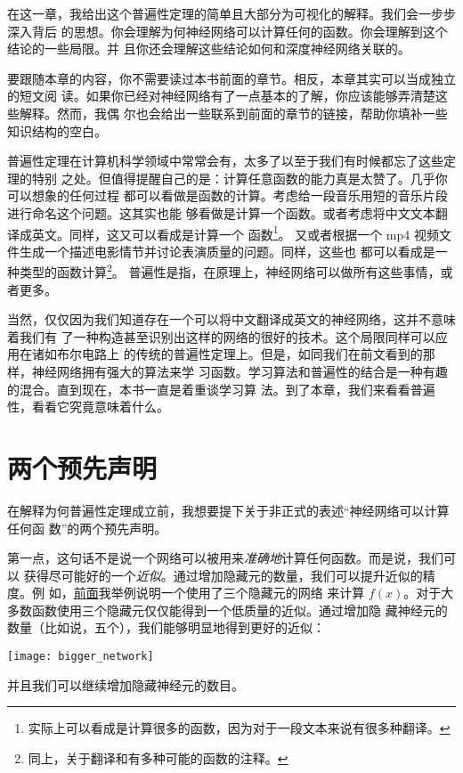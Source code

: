 在这一章，我给出这个普遍性定理的简单且大部分为可视化的解释。我们会一步步深入背后
的思想。你会理解为何神经网络可以计算任何的函数。你会理解到这个结论的一些局限。并
且你还会理解这些结论如何和深度神经网络关联的。

要跟随本章的内容，你不需要读过本书前面的章节。相反，本章其实可以当成独立的短文阅
读。如果你已经对神经网络有了一点基本的了解，你应该能够弄清楚这些解释。然而，我偶
尔也会给出一些联系到前面的章节的链接，帮助你填补一些知识结构的空白。

普遍性定理在计算机科学领域中常常会有，太多了以至于我们有时候都忘了这些定理的特别
之处。但值得提醒自己的是：计算任意函数的能力真是太赞了。几乎你可以想象的任何过程
都可以看做是函数的计算。考虑给一段音乐用短的音乐片段进行命名这个问题。这其实也能
够看做是计算一个函数。或者考虑将中文文本翻译成英文。同样，这又可以看成是计算一个
函数\footnote{实际上可以看成是计算很多的函数，因为对于一段文本来说有很多种翻译。}。
又或者根据一个 mp4 视频文件生成一个描述电影情节并讨论表演质量的问题。同样，这些也
都可以看成是一种类型的函数计算\footnote{同上，关于翻译和有多种可能的函数的注释。}。
普遍性是指，在原理上，神经网络可以做所有这些事情，或者更多。

当然，仅仅因为我们知道存在一个可以将中文翻译成英文的神经网络，这并不意味着我们有
了一种构造甚至识别出这样的网络的很好的技术。这个局限同样可以应用在诸如布尔电路上
的传统的普遍性定理上。但是，如同我们在前文看到的那样，神经网络拥有强大的算法来学
习函数。学习算法和普遍性的结合是一种有趣的混合。直到现在，本书一直是着重谈学习算
法。到了本章，我们来看看普遍性，看看它究竟意味着什么。

\section{两个预先声明}
\label{sec:two_caveats}

在解释为何普遍性定理成立前，我想要提下关于非正式的表述“神经网络可以计算任何函
数”的两个预先声明。

第一点，这句话不是说一个网络可以被用来\emph{准确地}计算任何函数。而是说，我们可以
获得尽可能好的一个\emph{近似}。通过增加隐藏元的数量，我们可以提升近似的精度。例
如，\hyperref[basic_network_precursor]{前面}我举例说明一个使用了三个隐藏元的网络
来计算 $f(x)$。对于大多数函数使用三个隐藏元仅仅能得到一个低质量的近似。通过增加隐
藏神经元的数量（比如说，五个），我们能够明显地得到更好的近似：
\begin{center}
  \texttt{[image: bigger\_network]}
\end{center}

并且我们可以继续增加隐藏神经元的数目。

